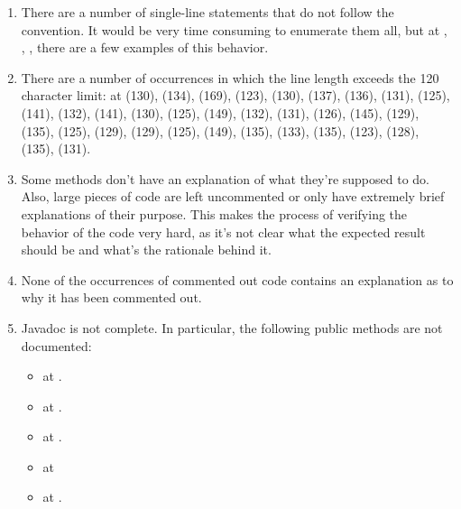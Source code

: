 \begin{enumerate}
	\item {} There are a number of single-line  statements that do not follow the convention. It would be very time consuming to enumerate them all, but at , , ,  there are a few examples of this behavior. 
	\item {} There are a number of occurrences in which the line length exceeds the 120 character limit: at  (130),  (134),  (169), (123),  (130),  (137),  (136),  (131),  (125),  (141),  (132),  (141),  (130),  (125),  (149),  (132),  (131),  (126),  (145),  (129),  (135),  (125),  (129),  (129),  (125),  (149),  (135),  (133),  (135),  (123),  (128),  (135),  (131).
	\item {} Some methods don't have an explanation of what they're supposed to do. Also, large pieces of code are left uncommented or only have extremely brief explanations of their purpose. This makes the process of verifying the behavior of the code very hard, as it's not clear what the expected result should be and what's the rationale behind it. 
	\item {} None of the occurrences of commented out code contains an explanation as to why it has been commented out. 
	\item {} Javadoc is not complete. In particular, the following public methods are not documented: 
		\begin{itemize}
		\item {} at .
		\item {} at .
		\item {} at .
		\item {} at 
		\item {} at .

\end{itemize}
\end{enumerate}

